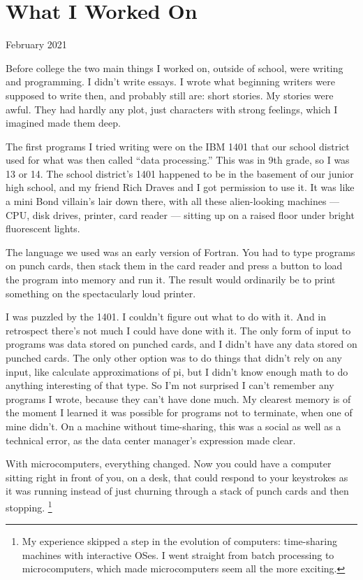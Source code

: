 \chapter{What I Worked On}

February 2021

Before college the two main things I worked on, outside of school, were
writing and programming. I didn't write essays. I wrote what beginning
writers were supposed to write then, and probably still are: short
stories. My stories were awful. They had hardly any plot, just
characters with strong feelings, which I imagined made them deep.

The first programs I tried writing were on the IBM 1401 that our school
district used for what was then called ``data processing.'' This was in
9th grade, so I was 13 or 14. The school district's 1401 happened to be
in the basement of our junior high school, and my friend Rich Draves and
I got permission to use it. It was like a mini Bond villain's lair down
there, with all these alien-looking machines --- CPU, disk drives,
printer, card reader --- sitting up on a raised floor under bright
fluorescent lights.

The language we used was an early version of Fortran. You had to type
programs on punch cards, then stack them in the card reader and press a
button to load the program into memory and run it. The result would
ordinarily be to print something on the spectacularly loud printer.

I was puzzled by the 1401. I couldn't figure out what to do with it. And
in retrospect there's not much I could have done with it. The only form
of input to programs was data stored on punched cards, and I didn't have
any data stored on punched cards. The only other option was to do things
that didn't rely on any input, like calculate approximations of pi, but
I didn't know enough math to do anything interesting of that type. So
I'm not surprised I can't remember any programs I wrote, because they
can't have done much. My clearest memory is of the moment I learned it
was possible for programs not to terminate, when one of mine didn't. On
a machine without time-sharing, this was a social as well as a technical
error, as the data center manager's expression made clear.

With microcomputers, everything changed. Now you could have a computer
sitting right in front of you, on a desk, that could respond to your
keystrokes as it was running instead of just churning through a stack of
punch cards and then stopping. \footnote{My experience skipped a step in the evolution of computers:
time-sharing machines with interactive OSes. I went straight from batch
processing to microcomputers, which made microcomputers seem all the
more exciting.}

